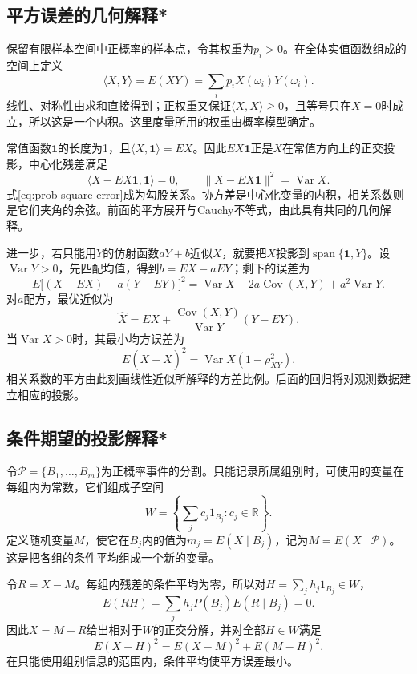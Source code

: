 \FloatBarrier
\newpage
\subsection{平方误差的几何解释*}

保留有限样本空间中正概率的样本点，令其权重为\(p_i>0\)。在全体实值函数组成的空间上定义
\begin{equation}\label{eq:prob-weighted-inner-product}
 \langle X,Y\rangle=E(XY)=\sum_i p_iX(\omega_i)Y(\omega_i).
\end{equation}
线性、对称性由求和直接得到；正权重又保证\(\langle X,X\rangle\ge0\)，且等号只在\(X=0\)时成立，所以这是一个内积。这里度量所用的权重由概率模型确定。

常值函数\(\mathbf1\)的长度为1，且\(\langle X,\mathbf1\rangle=EX\)。因此\(EX\mathbf1\)正是\(X\)在常值方向上的正交投影，中心化残差满足
\[
 \langle X-EX\mathbf1,\mathbf1\rangle=0,\qquad
 \|X-EX\mathbf1\|^2=\operatorname{Var}X.
\]
式\eqref{eq:prob-square-error}成为勾股关系。协方差是中心化变量的内积，相关系数则是它们夹角的余弦。前面的平方展开与Cauchy不等式，由此具有共同的几何解释。

进一步，若只能用\(Y\)的仿射函数\(aY+b\)近似\(X\)，就要把\(X\)投影到\(\operatorname{span}\{\mathbf1,Y\}\)。设\(\operatorname{Var}Y>0\)，先匹配均值，得到\(b=EX-aEY\)；剩下的误差为
\[
 E\bigl[(X-EX)-a(Y-EY)\bigr]^2
 =\operatorname{Var}X-2a\operatorname{Cov}(X,Y)+a^2\operatorname{Var}Y.
\]
对\(a\)配方，最优近似为
\[
 \widehat X=EX+\frac{\operatorname{Cov}(X,Y)}{\operatorname{Var}Y}(Y-EY).
\]
当\(\operatorname{Var}X>0\)时，其最小均方误差为
\[
 E(X-\widehat X)^2=\operatorname{Var}X(1-\rho_{XY}^2).
\]
相关系数的平方由此刻画线性近似所解释的方差比例。后面的回归将对观测数据建立相应的投影。

\subsection{条件期望的投影解释*}

令\(\mathcal P=\{B_1,\ldots,B_m\}\)为正概率事件的分割。只能记录所属组别时，可使用的变量在每组内为常数，它们组成子空间
\[
 W=\left\{\sum_j c_j1_{B_j}:c_j\in\mathbb R\right\}.
\]
定义随机变量\(M\)，使它在\(B_j\)内的值为\(m_j=E(X\mid B_j)\)，记为\(M=E(X\mid\mathcal P)\)。这是把各组的条件平均组成一个新的变量。

令\(R=X-M\)。每组内残差的条件平均为零，所以对\(H=\sum_jh_j1_{B_j}\in W\)，
\[
 E(RH)=\sum_jh_jP(B_j)E(R\mid B_j)=0.
\]
因此\(X=M+R\)给出相对于\(W\)的正交分解，并对全部\(H\in W\)满足
\begin{equation}\label{eq:prob-conditional-projection}
 E(X-H)^2=E(X-M)^2+E(M-H)^2.
\end{equation}
在只能使用组别信息的范围内，条件平均使平方误差最小。

